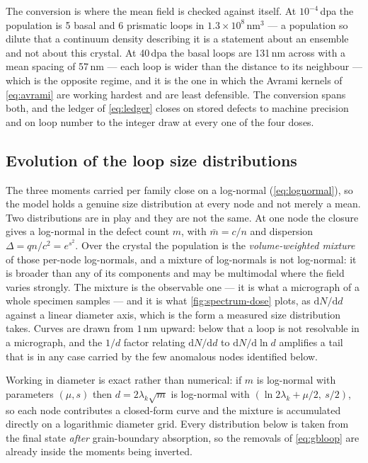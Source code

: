 The conversion is where the mean field is checked against itself. At
$10^{-4}\,$dpa the population is 5 basal and 6 prismatic loops in
$1.3\times10^{8}\,\mathrm{nm^{3}}$ --- a population so dilute that a continuum
density describing it is a statement about an ensemble and not about this
crystal. At 40\,dpa the basal loops are 131\,nm across with a mean spacing of
57\,nm --- each loop is wider than the distance to its neighbour --- which is
the opposite regime, and it is the one in which the
Avrami kernels of \cref{eq:avrami} are working hardest and are least defensible.
The conversion spans both, and the ledger of \cref{eq:ledger} closes on stored
defects to machine precision and on loop number to the integer draw at every one
of the four doses.

\subsection{Evolution of the loop size distributions}
\label{sec:results-spectrum}

The three moments carried per family close on a log-normal
(\cref{eq:lognormal}), so the model holds a genuine size distribution at every
node and not merely a mean. Two distributions are in play and they are
not the same. At one node the closure gives a log-normal in the defect count
$m$, with $\bar m=c/n$ and dispersion $\Delta=qn/c^{2}=e^{s^{2}}$. Over the
crystal the population is the \emph{volume-weighted mixture} of those per-node
log-normals, and a mixture of log-normals is not log-normal: it is broader than
any of its components and may be multimodal where the field varies strongly.
The mixture is the observable one --- it is what a micrograph of a whole
specimen samples --- and it is what \cref{fig:spectrum-dose} plots, as
$\mathrm{d}N/\mathrm{d}d$ against a linear diameter axis, which is the form a
measured size distribution takes. Curves are drawn from $1\,$nm upward: below
that a loop is not resolvable in a micrograph, and the $1/d$ factor relating
$\mathrm{d}N/\mathrm{d}d$ to $\mathrm{d}N/\mathrm{d}\ln d$ amplifies a tail
that is in any case carried by the few anomalous nodes identified below.

Working in diameter is exact rather than numerical: if $m$ is log-normal with
parameters $(\mu,s)$ then $d=2\lambda_k\sqrt m$ is log-normal with
$(\ln 2\lambda_k+\mu/2,\ s/2)$, so each node contributes a closed-form curve and
the mixture is accumulated directly on a logarithmic diameter grid. Every
distribution below is taken from the final state \emph{after} grain-boundary
absorption, so the removals of \cref{eq:gbloop} are already inside the moments
being inverted.

